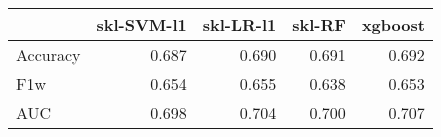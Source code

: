 \begin{tabular}{lrrrr}
\toprule
{} &  skl-SVM-l1 &  skl-LR-l1 &  skl-RF &  xgboost \\
\midrule
Accuracy &       0.687 &      0.690 &   0.691 &    0.692 \\
F1w      &       0.654 &      0.655 &   0.638 &    0.653 \\
AUC      &       0.698 &      0.704 &   0.700 &    0.707 \\
\bottomrule
\end{tabular}
